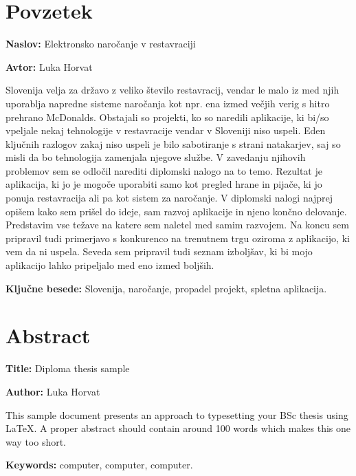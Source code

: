 \documentclass[a4paper, 12pt]{book}
\newcommand{\ttitle}{Elektronsko naročanje v restavraciji}
\newcommand{\ttitleEn}{Diploma thesis sample}
\newcommand{\tauthor}{Luka Horvat}
\newcommand{\tkeywords}{Slovenija, naročanje, propadel projekt, spletna aplikacija}
\newcommand{\tkeywordsEn}{computer, computer, computer}
\newcommand{\clearemptydoublepage}{\newpage{\pagestyle{empty}\cleardoublepage}}
\begin{document}
\chapter*{Povzetek}

\noindent\textbf{Naslov:} \ttitle
\bigskip

\noindent\textbf{Avtor:} \tauthor
\bigskip

\noindent 
Slovenija velja za državo z veliko število restavracij, vendar le malo iz med njih uporablja napredne sisteme naročanja kot npr. ena izmed večjih verig s hitro prehrano McDonalds. Obstajali so projekti, ko so naredili aplikacije, ki bi/so vpeljale nekaj tehnologije v restavracije vendar v Sloveniji niso uspeli. Eden ključnih razlogov zakaj niso uspeli je bilo sabotiranje s strani natakarjev, saj so misli da bo tehnologija zamenjala njegove službe. V zavedanju njihovih problemov sem se odločil narediti diplomski nalogo na to temo. Rezultat je aplikacija, ki jo je mogoče uporabiti samo kot pregled hrane in pijače, ki jo ponuja restavracija ali pa kot sistem za naročanje. V diplomski nalogi najprej opišem kako sem prišel do ideje, sam razvoj aplikacije in njeno končno delovanje. Predstavim vse težave na katere sem naletel med samim razvojem. Na koncu sem pripravil tudi primerjavo s konkurenco na trenutnem trgu oziroma z aplikacijo, ki vem da ni uspela. Seveda sem pripravil tudi seznam izboljšav, ki bi mojo aplikacijo lahko pripeljalo med eno izmed boljših.

\noindent\textbf{Ključne besede:} \tkeywords.
\clearemptydoublepage

\chapter*{Abstract}

\noindent\textbf{Title:} \ttitleEn
\bigskip

\noindent\textbf{Author:} \tauthor
\bigskip

\noindent This sample document presents an approach to typesetting your BSc thesis using \LaTeX. 
A proper abstract should contain around 100 words which makes this one way too short.
\bigskip

\noindent\textbf{Keywords:} \tkeywordsEn.
\clearemptydoublepage

\mainmatter
\setcounter{page}{1}
\pagestyle{fancy}
\end{document}
